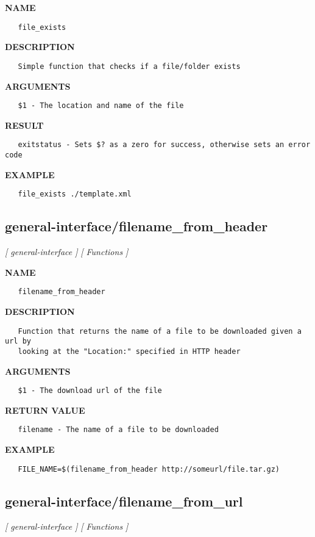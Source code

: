 \label{ch:robo20}
\label{ch:general_interface_file_exists}
\textbf{NAME}
\begin{verbatim}
   file_exists
\end{verbatim}
\textbf{DESCRIPTION}
\begin{verbatim}
   Simple function that checks if a file/folder exists
\end{verbatim}
\textbf{ARGUMENTS}
\begin{verbatim}
   $1 - The location and name of the file
\end{verbatim}
\textbf{RESULT}
\begin{verbatim}
   exitstatus - Sets $? as a zero for success, otherwise sets an error code
\end{verbatim}
\textbf{EXAMPLE}
\begin{verbatim}
   file_exists ./template.xml
\end{verbatim}
\newpage
\subsection{general-interface/filename\_from\_header}
\textsl{[ general-interface ]}
\textsl{[ Functions ]}

\label{ch:robo21}
\label{ch:general_interface_filename_from_header}
\textbf{NAME}
\begin{verbatim}
   filename_from_header
\end{verbatim}
\textbf{DESCRIPTION}
\begin{verbatim}
   Function that returns the name of a file to be downloaded given a url by
   looking at the "Location:" specified in HTTP header
\end{verbatim}
\textbf{ARGUMENTS}
\begin{verbatim}
   $1 - The download url of the file
\end{verbatim}
\textbf{RETURN VALUE}
\begin{verbatim}
   filename - The name of a file to be downloaded
\end{verbatim}
\textbf{EXAMPLE}
\begin{verbatim}
   FILE_NAME=$(filename_from_header http://someurl/file.tar.gz)
\end{verbatim}
\newpage
\subsection{general-interface/filename\_from\_url}
\textsl{[ general-interface ]}
\textsl{[ Functions ]}

